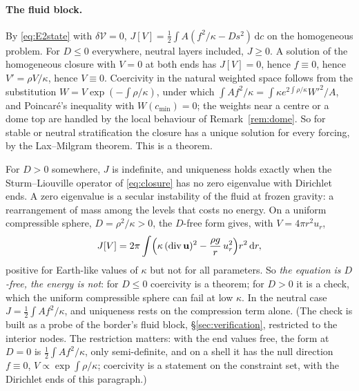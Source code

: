 \documentclass[11pt]{article}
\theoremstyle{definition}
\theoremstyle{remark}
\newcommand{\bu}{\mathbf{u}}
\newcommand{\dc}{\,\mathrm{d}c}
\newcommand{\Div}{\operatorname{div}}
\newcommand{\Vol}{\mathcal V}
\begin{document}
\paragraph{The fluid block.} By \eqref{eq:E2state} with $\delta\Vol =
0$, $J[V] = \tfrac12\int A(f^2/\kappa - Ds^2)\dc$ on the homogeneous
problem. For $D \le 0$ everywhere, neutral layers included, $J \ge 0$.
A solution of the homogeneous closure with $V = 0$ at both ends has
$J[V] = 0$, hence $f \equiv 0$, hence $V' = \rho V/\kappa$, hence $V
\equiv 0$. Coercivity in the natural weighted space follows from the
substitution $W = V\exp(-\int\rho/\kappa)$, under which $\int
Af^2/\kappa = \int\kappa e^{2\int\rho/\kappa}W'^2/A$, and Poincar\'e's
inequality with $W(c_{\min}) = 0$; the weights near a centre or a dome
top are handled by the local behaviour of Remark~\ref{rem:dome}. So for
stable or neutral stratification the closure has a unique solution
for every forcing, by the Lax--Milgram theorem. This is a theorem.

For $D > 0$ somewhere, $J$ is indefinite, and uniqueness holds exactly
when the Sturm--Liouville operator of \eqref{eq:closure} has no zero
eigenvalue with Dirichlet ends. A zero eigenvalue is a secular
instability of the fluid at frozen gravity: a rearrangement of mass
among the levels that costs no energy. On a uniform compressible
sphere, $D = \rho^2/\kappa > 0$, the $D$-free form gives, with $V =
4\pi r^2u_r$,
\begin{equation*}
  J[V] = 2\pi\int\Bigl(\kappa\,(\Div\bu)^2 - \frac{\rho g}{r}\,u_r^2\Bigr)r^2\,\mathrm dr ,
\end{equation*}
positive for Earth-like values of $\kappa$ but not for all parameters.
So \emph{the equation is $D$-free, the energy is not}: for $D \le 0$
coercivity is a theorem; for $D > 0$ it is a check, which the uniform
compressible sphere can fail at low $\kappa$. In the neutral case $J =
\tfrac12\int Af^2/\kappa$, and uniqueness rests on the compression term
alone. (The check is built as a probe of the border's fluid block,
\S\ref{sec:verification}, restricted to the interior nodes. The
restriction matters: with the end values free, the form at $D = 0$ is
$\tfrac12\int Af^2/\kappa$, only semi-definite, and on a shell it has
the null direction $f \equiv 0$, $V \propto \exp\int\rho/\kappa$;
coercivity is a statement on the constraint set, with the Dirichlet
ends of this paragraph.)
\end{document}
